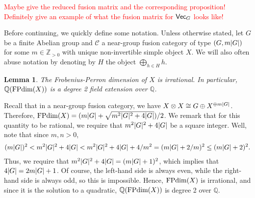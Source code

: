 \documentclass[12pt, reqno]{amsart}
\numberwithin{equation}{section}
\theoremstyle{plainspace}
\newtheorem{lemma}[theorem]{Lemma}
\theoremstyle{definitionspace}
\theoremstyle{remarkspace}
\renewenvironment{proof}{{\noindent\textbf{Proof.}}}{\null\hfill\qedsymbol}
\DeclarePairedDelimiter{\abs}{\lvert}{\rvert}
\newcommand{\mathcat}[1]{\mathcal{#1}}
\newcommand{\textcat}[1]{\textup{\textsf{#1}}}
\newcommand{\FPdim}{\textup{FPdim}}
\begin{document}
\noindent \textcolor{red}{Maybe give the reduced fusion matrix and the corresponding proposition! Definitely give an example of what the fusion matrix for $\textcat{Vec}_G$ looks like!}
\newline

\noindent Before continuing, we quickly define some notation. Unless otherwise stated, let $G$ be a finite Abelian group and $\mathcat{C}$ a near-group fusion category of type $(G, m\abs{G})$ for some $m \in \mathbb{Z}_{>0}$ with unique non-invertible simple object $X$. We will also often abuse notation by denoting by $H$ the object $\bigoplus_{h \in H}{h}$.
\newline

\begin{lemma}\label{lem:near-group_non-invertible_irrational}
The Frobenius-Perron dimension of $X$ is irrational. In particular, $\mathbb{Q}(\FPdim(X))$ is a degree 2 field extension over $\mathbb{Q}$.
\end{lemma}
\leavevmode\newline
\begin{proof}
Recall that in a near-group fusion category, we have $X \otimes X \cong G \oplus X^{\oplus m\abs{G}}$. Therefore, $\FPdim(X) = (m\abs{G} + \sqrt{m^2\abs{G}^2 + 4\abs{G}})/2$. We remark that for this quantity to be rational, we require that $m^2\abs{G}^2 + 4\abs{G}$ be a square integer. Well, note that since $m, n > 0$,
\begin{align*}
\begin{split}
(m\abs{G})^2 < m^2\abs{G}^2 + 4\abs{G} < m^2\abs{G}^2 + 4\abs{G} + 4/m^2 = (m\abs{G} + 2/m)^2 \leq (m\abs{G} + 2)^2.
\end{split}
\end{align*}
Thus, we require that $m^2\abs{G}^2 + 4\abs{G} = (m\abs{G} + 1)^2$, which implies that $4\abs{G} = 2m\abs{G} + 1$. Of course, the left-hand side is always even, while the right-hand side is always odd, so this is impossible. Hence, $\FPdim(X)$ is irrational, and since it is the solution to a quadratic, $\mathbb{Q}(\FPdim(X))$ is degree 2 over $\mathbb{Q}$.
\end{proof}
\newline
\end{document}
